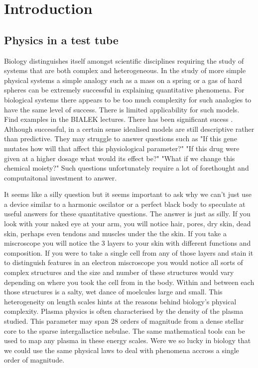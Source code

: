 \chapter{Introduction}
\setcounter{page}{1}
\label{chap:intro}

\section{Physics in a test tube}
\chapquote{}{}

\vskip 0.5cm

Biology distinguishes itself amongst scientific disciplines requiring the study of systems that are both complex and heterogeneous. In the study of more simple physical systems a simple analogy such as a mass on a spring or a gas of hard spheres can be extremely successful in explaining quantitative phenomena. For biological systems there appears to be too much complexity for such analogies to have the same level of success. There is limited applicability for such models. Find examples in the BIALEK lectures. There has been significant sucess . Although successful, in a certain sense idealised models are still descriptive rather than predictive. They may struggle to answer questions such as "If this gene mutates how will that affect this physiological parameter?" "If this drug were given at a higher dosage what would its effect be?" "What if we change this chemical moiety?" Such questions unfortunately require a lot of forethought and computaitonal investment to answer. 

It seems like a silly question but it seems important to ask why we can't just use a device similar to a harmonic oscilator or a perfect black body to speculate at useful answers for these quantitative questions. The answer is just as silly. If you look with your naked eye at your arm, you will notice hair, pores, dry skin, dead skin, perhaps even tendons and muscles under the the skin. If you take a miscroscope you will notice the 3 layers to your skin with different functions and composition. If you were to take a single cell from any of those layers and stain it to distinguish features in an electron miscroscope you would notice all sorts of complex structures and the size and number of these structures would vary depending on where you took the cell from in the body. Within and between each those structures is a salty, wet dance of moelcules large and small. This heterogeneity on length scales hints at the reasons behind biology's physical complexity. Plasma physics is often characterised by the density of the plasma studied. This parameter may span 28 orders of magnitude from a dense stellar core to the sparse intergallactice nebulae. The same mathematical tools can be used to map any plasma in these energy scales. Were we so lucky in biology that we could use the same physical laws to deal with phenomena accross a single order of magnitude.  


